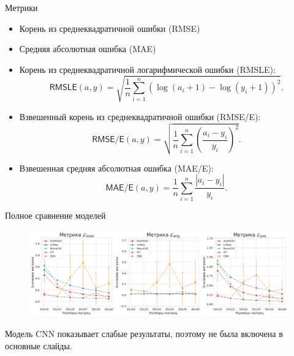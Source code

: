 \documentclass[9pt]{beamer}
\begin{document}
\begin{frame}{Метрики}
    \begin{itemize}
        \item Корень из среднеквадратичной ошибки (\textsf{RMSE})
        \item Средняя абсолютная ошибка (\textsf{MAE})
        \item Корень из среднеквадратичной логарифмической ошибки (\textsf{RMSLE}): \[ \textsf{RMSLE}(a, y) = \sqrt{\frac{1}{n} \sum_{i = 1}^{n} (\log(a_i + 1) - \log(y_i + 1))^2} . \]
        \item Взвешенный корень из среднеквадратичной ошибки (\textsf{RMSE/E}): \[ \textsf{RMSE/E}(a, y) = \sqrt{\frac{1}{n} \sum_{i = 1}^{n} \left( \frac{a_i - y_i}{y_i} \right)^2} . \]
        \item Взвешенная средняя абсолютная ошибка (\textsf{MAE/E}): \[ \textsf{MAE/E}(a, y) = \frac{1}{n} \sum_{i = 1}^{n} \frac{|a_i - y_i|}{y_i} . \]
    \end{itemize}
\end{frame}

\begin{frame}{Полное сравнение моделей}
    \begin{figure}
        \centering
        \includegraphics[width=1.0\textwidth]{../report/graphics/models_comp_extra.png}
    \end{figure}

    \begin{block}{}
        Модель CNN показывает слабые результаты, поэтому не была включена в основные слайды.
    \end{block}
\end{frame}
\end{document}
